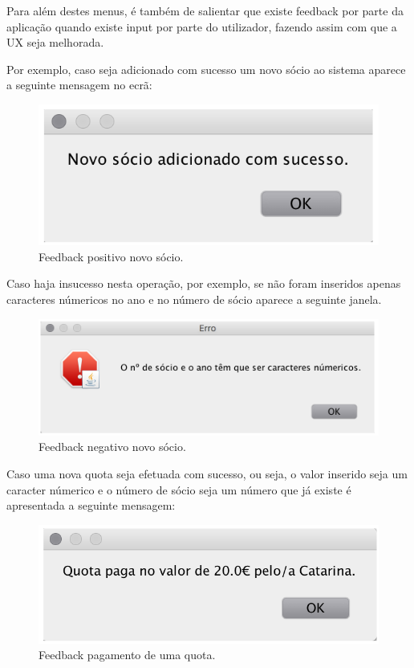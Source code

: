 \documentclass[a4paper]{article}
\begin{document}
Para além destes menus, é também de salientar que existe feedback por parte da aplicação quando existe input por parte do utilizador, fazendo assim com que a UX seja melhorada.

Por exemplo, caso seja adicionado com sucesso um novo sócio ao sistema aparece a seguinte mensagem no ecrã:

\begin{figure}[H]
\centering
\includegraphics[scale=0.35]{imgs/feedbackNovoSocio.png}
\caption{Feedback positivo novo sócio.}
\label{img:feedbackNovoSocio}
\end{figure}

Caso haja insucesso nesta operação, por exemplo, se não foram inseridos apenas caracteres númericos no ano e no número de sócio aparece a seguinte janela.

\begin{figure}[H]
\centering
\includegraphics[scale=0.35]{imgs/feedbackNegatNovoS.png}
\caption{Feedback negativo novo sócio.}
\label{img:feedbackNegatNovoS}
\end{figure}

Caso uma nova quota seja efetuada com sucesso, ou seja, o valor inserido seja um caracter númerico e o número de sócio seja um número que já existe é apresentada a seguinte mensagem:


\begin{figure}[H]
\centering
\includegraphics[scale=0.35]{imgs/feedbackQuota.png}
\caption{Feedback pagamento de uma quota.}
\label{img:feedbackQuota}
\end{figure}
\end{document}
